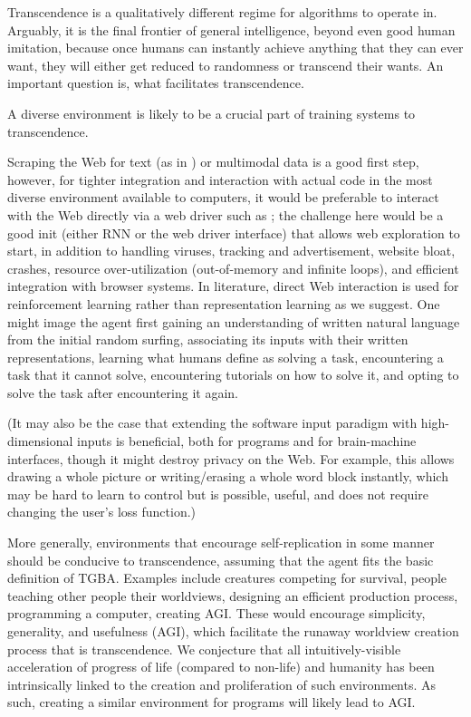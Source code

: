 \documentclass{article}
\begin{document}
Transcendence is a qualitatively different regime for algorithms to operate in. Arguably, it is the final frontier of general intelligence, beyond even good human imitation, because once humans can instantly achieve anything that they can ever want, they will either get reduced to randomness or transcend their wants. An important question is, what facilitates transcendence.

A diverse environment is likely to be a crucial part of training systems to transcendence.

Scraping the Web for text (as in \cite{NEURIPS2020_1457c0d6}) or multimodal data is a good first step, however, for tighter integration and interaction with actual code in the most diverse environment available to computers, it would be preferable to interact with the Web directly via a web driver such as \cite{8117878}; the challenge here would be a good init (either RNN or the web driver interface) that allows web exploration to start, in addition to handling viruses, tracking and advertisement, website bloat, crashes, resource over-utilization (out-of-memory and infinite loops), and efficient integration with browser systems. In literature, direct Web interaction is used for reinforcement learning \cite{ToyamaEtAl2021AndroidEnv} \cite{pmlr-v70-shi17a} rather than representation learning as we suggest. One might image the agent first gaining an understanding of written natural language from the initial random surfing, associating its inputs with their written representations, learning what humans define as solving a task, encountering a task that it cannot solve, encountering tutorials on how to solve it, and opting to solve the task after encountering it again.

(It may also be the case that extending the software input paradigm with high-dimensional inputs is beneficial, both for programs and for brain-machine interfaces, though it might destroy privacy on the Web. For example, this allows drawing a whole picture or writing/erasing a whole word block instantly, which may be hard to learn to control but is possible, useful, and does not require changing the user's loss function.)

More generally, environments that encourage self-replication in some manner should be conducive to transcendence, assuming that the agent fits the basic definition of TGBA. Examples include creatures competing for survival, people teaching other people their worldviews, designing an efficient production process, programming a computer, creating AGI. These would encourage simplicity, generality, and usefulness (AGI), which facilitate the runaway worldview creation process that is transcendence. We conjecture that all intuitively-visible acceleration of progress of life (compared to non-life) and humanity has been intrinsically linked to the creation and proliferation of such environments. As such, creating a similar environment for programs will likely lead to AGI.
\end{document}

